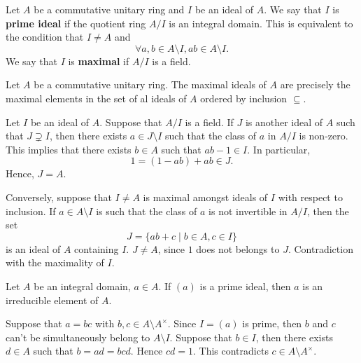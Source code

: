 \begin{definitionenv}
    Let $A$ be a commutative unitary ring and $I$ be an ideal of $A$.
    We say that $I$ is \textbf{prime ideal} if the quotient ring $A/I$ is an integral domain.
    This is equivalent to the condition that $I \neq A$ and
    $$\forall a,b \in A \setminus I, ab \in A \setminus I.$$
    We say that $I$ is \textbf{maximal} if $A/I$ is a field.
\end{definitionenv}

\begin{propositionenv}\label{prop:6.1.9}
    Let $A$ be a commutative unitary ring.
    The maximal ideals of $A$ are precisely the maximal elements in the set of al ideals of $A$ ordered by inclusion $\subseteq$.
\end{propositionenv}
\begin{proofenv}
    Let $I$ be an ideal of $A$.
    Suppose that $A/I$ is a field.
    If $J$ is another ideal of $A$ such that $J \supsetneq I$,
    then there exists $a \in J \setminus I$ such that the class of $a$ in $A/I$ is non-zero.
    This implies that there exists $b \in A$ such that $ab - 1 \in I$.
    In particular,
    $$1 = (1 - ab) + ab \in J.$$
    Hence, $J = A$.

    \quad Conversely, suppose that $I \neq A$ is maximal amongst ideals of $I$ with respect to inclusion.
    If $a \in A \setminus I$ is such that the class of $a$ is not invertible in $A/I$, then the set
    $$J = \{ab + c \mid b \in A, c \in I\}$$
    is an ideal of $A$ containing $I$.
    $J \neq A$, since $1$ does not belongs to $J$.
    Contradiction with the maximality of $I$.
\end{proofenv}

\begin{propositionenv}
    Let $A$ be an integral domain, $a \in A$.
    If $(a)$ is a prime ideal,
    then $a$ is an irreducible element of $A$.
\end{propositionenv}
\begin{proofenv}
    Suppose that $a = bc$ with $b,c \in A\setminus A^\times$.
    Since $I = (a)$ is prime,
    then $b$ and $c$ can't be simultaneously belong to $A\setminus I$. 
    Suppose that $b \in I$,
    then there exists $d \in A$ such that
    $b = ad = bcd$.
    Hence $cd = 1$.
    This contradicts $c \in A \setminus A^\times$.
\end{proofenv}

